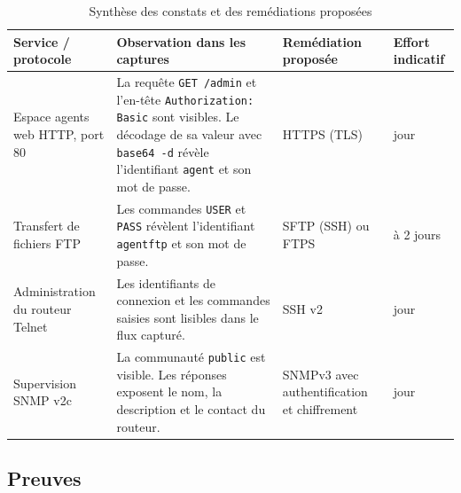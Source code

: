 \documentclass[11pt,a4paper]{article}
\renewcommand{\arraystretch}{1.25}
\begin{document}
	\begin{table}[H]
		\centering
		\small
		\renewcommand{\arraystretch}{1.2}
		\begin{tabularx}{\linewidth}{
				>{\raggedright\arraybackslash}p{2.6cm}
				>{\raggedright\arraybackslash}X
				>{\raggedright\arraybackslash}p{2.7cm}
				>{\raggedright\arraybackslash}p{1.8cm}
			}
			\toprule
			Service / protocole &
			Observation dans les captures &
			Remédiation proposée &
			Effort indicatif \\
			\midrule
			
			Espace agents web
			\newline HTTP, port 80 &
			La requête \texttt{GET /admin} et l'en-tête
			\texttt{Authorization: Basic} sont visibles.
			Le décodage de sa valeur avec \texttt{base64 -d}
			révèle l'identifiant \texttt{agent} et son mot de passe. &
			HTTPS (TLS) &
			1 jour \\
			
			\midrule
			
			Transfert de fichiers
			\newline FTP &
			Les commandes \texttt{USER} et \texttt{PASS}
			révèlent l'identifiant \texttt{agentftp}
			et son mot de passe. &
			SFTP (SSH) ou FTPS &
			1 à 2 jours \\
			
			\midrule
			
			Administration du routeur
			\newline Telnet &
			Les identifiants de connexion et les commandes
			saisies sont lisibles dans le flux capturé. &
			SSH v2 &
			1 jour \\
			
			\midrule
			
			Supervision
			\newline SNMP v2c &
			La communauté \texttt{public} est visible.
			Les réponses exposent le nom, la description
			et le contact du routeur. &
			SNMPv3 avec authentification et chiffrement &
			1 jour \\
			
			\bottomrule
		\end{tabularx}
		
		\caption{Synthèse des constats et des remédiations proposées}
		\label{tab:constats}
		
	\end{table}
	
	\subsection*{Preuves}
	
\end{document}
